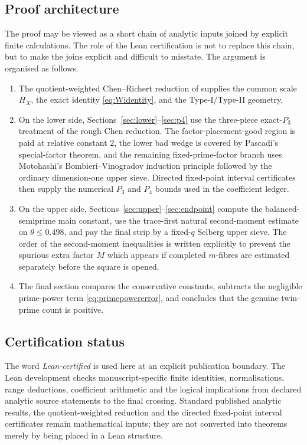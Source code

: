 \documentclass{aomart}
\theoremstyle{definition}
\newcommand{\1}{\mathbf 1}
\begin{document}
\subsection{Proof architecture}
The proof may be viewed as a short chain of analytic inputs joined by explicit finite calculations.  The role of the Lean certification is not to replace this chain, but to make the joins explicit and difficult to misstate.  The argument is organised as follows.
\begin{enumerate}[label=\textup{(\roman*)},leftmargin=*]
\item The quotient-weighted Chen--Richert reduction of \cite{RatliffReduction2026,RatliffRough2026} supplies the common scale $H_X$, the exact identity \eqref{eq:Widentity}, and the Type-I/Type-II geometry.
\item On the lower side, Sections~\ref{sec:lower}--\ref{sec:p4} use the three-piece exact-$P_3$ treatment of the rough Chen reduction.  The factor-placement-good region is paid at relative constant $2$, the lower bad wedge is covered by Pascadi's special-factor theorem, and the remaining fixed-prime-factor branch uses Motohashi's Bombieri--Vinogradov induction principle followed by the ordinary dimension-one upper sieve.  Directed fixed-point interval certificates then supply the numerical $P_3$ and $P_4$ bounds used in the coefficient ledger.
\item On the upper side, Sections~\ref{sec:upper}--\ref{sec:endpoint} compute the balanced-semiprime main constant, use the trace-first natural second-moment estimate on $\theta\le0.498$, and pay the final strip by a fixed-$q$ Selberg upper sieve.  The order of the second-moment inequalities is written explicitly to prevent the spurious extra factor $M$ which appears if completed $m$-fibres are estimated separately before the square is opened.
\item The final section compares the conservative constants, subtracts the negligible prime-power term \eqref{eq:primepowererror}, and concludes that the genuine twin-prime count is positive.
\end{enumerate}
\subsection{Certification status}
The word \emph{Lean-certified} is used here at an explicit publication boundary.  The Lean development checks manuscript-specific finite identities, normalisations, range deductions, coefficient arithmetic and the logical implications from declared analytic source statements to the final crossing.  Standard published analytic results, the quotient-weighted reduction and the directed fixed-point interval certificates remain mathematical inputs; they are not converted into theorems merely by being placed in a Lean structure.
\end{document}
